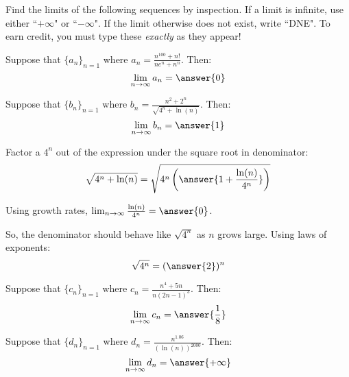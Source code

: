 \documentclass{ximera}
\author{Jim Talamo}
\begin{document}
\begin{exercise}

Find the limits of the following sequences by inspection.  If a limit is infinite, use either ``$+\infty$" or ``$-\infty$".  If the limit otherwise does not exist, write ``DNE".  To earn credit, you must type these \emph{exactly} as they appear!

\begin{exercise}
Suppose that $\{a_n \}_{n=1}$ where $a_n = \frac{n^{100}+n!}{ne^n+n^n}$.  Then:
\[
\lim_{n \to \infty} a_n = \answer{0}
\]
\end{exercise}

\begin{exercise}
Suppose that $\{b_n \}_{n=1}$ where $b_n = \frac{n^2+2^n}{\sqrt{4^n+\ln(n)}}$.  Then:
\[
\lim_{n \to \infty} b_n = \answer{1}
\]
\begin{hint}
Factor a $4^n$ out of the expression under the square root in denominator:
\[
\sqrt{4^n+\ln(n)} = \sqrt{4^n \left(\answer{1+ \frac{\ln(n)}{4^n}}\right)}
\]

\begin{question}
Using growth rates, $\lim_{n \to \infty} \frac{\ln(n)}{4^n} = \answer{0}$.

\begin{question}
So, the denominator should behave like $\sqrt{4^n}$ as $n$ grows large. Using laws of exponents:
\[
\sqrt{4^n} = (\answer{2})^n
\]
\end{question}
\end{question}
\end{hint}

\end{exercise}

\begin{exercise}
Suppose that $\{c_n \}_{n=1}$ where $c_n = \frac{n^4+5n}{n(2n-1)^3}$.  Then:
\[
\lim_{n \to \infty} c_n = \answer{\frac{1}{8}}
\]
\end{exercise}

\begin{exercise}
Suppose that $\{d_n \}_{n=1}$ where $d_n = \frac{n^{1.06}}{(\ln(n))^{2000}}$.  Then:
\[
\lim_{n \to \infty} d_n =  \answer{+\infty}
\]
\end{exercise}


\end{exercise}
\end{document}
